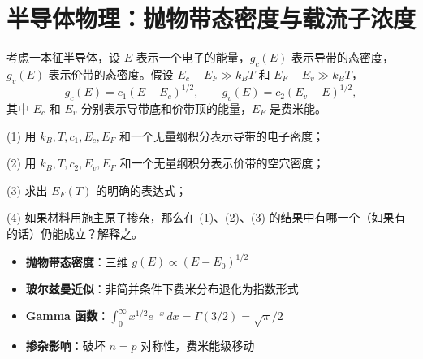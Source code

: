 \section{半导体物理：抛物带态密度与载流子浓度}
\label{sec:parabolic-dos-carrier-density}

\begin{modelbox}[题目：抛物带近似下的载流子统计]
考虑一本征半导体，设 $E$ 表示一个电子的能量，$g_c(E)$ 表示导带的态密度，$g_v(E)$ 表示价带的态密度。假设 $E_c-E_F\gg k_BT$ 和 $E_F-E_v\gg k_BT$，
\[
g_c(E)=c_1(E-E_c)^{1/2},\qquad g_v(E)=c_2(E_v-E)^{1/2},
\]
其中 $E_c$ 和 $E_v$ 分别表示导带底和价带顶的能量，$E_F$ 是费米能。

(1) 用 $k_B,T,c_1,E_c,E_F$ 和一个无量纲积分表示导带的电子密度；

(2) 用 $k_B,T,c_2,E_v,E_F$ 和一个无量纲积分表示价带的空穴密度；

(3) 求出 $E_F(T)$ 的明确的表达式；

(4) 如果材料用施主原子掺杂，那么在 (1)、(2)、(3) 的结果中有哪一个（如果有的话）仍能成立？解释之。
\end{modelbox}

\begin{tipbox}[考点快速分析]
\begin{itemize}
    \item \textbf{抛物带态密度}：三维 $g(E)\propto(E-E_0)^{1/2}$
    \item \textbf{玻尔兹曼近似}：非简并条件下费米分布退化为指数形式
    \item \textbf{Gamma 函数}：$\int_0^\infty x^{1/2}e^{-x}\,dx=\Gamma(3/2)=\sqrt{\pi}/2$
    \item \textbf{掺杂影响}：破坏 $n=p$ 对称性，费米能级移动
\end{itemize}
\end{tipbox}

